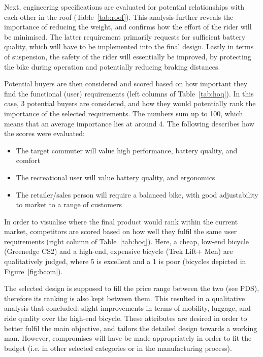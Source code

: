 \documentclass[a4paper,11pt]{article}
\begin{document}
Next, engineering specifications are evaluated for potential relationships with each other in the roof (Table~\ref{tab:roof}). This analysis further reveals the importance of reducing the weight, and confirms how the effort of the rider will be minimised. The latter requirement primarily requests for sufficient battery quality, which will have to be implemented into the final design. Lastly in terms of suspension, the safety of the rider will essentially be improved, by protecting the bike during operation and potentially reducing braking distances.

Potential buyers are then considered and scored based on how important they find the functional (user) requirements (left columns of Table~\ref{tab:hoq}). In this case, 3 potential buyers are considered, and how they would potentially rank the importance of the selected requirements. The numbers sum up to 100, which means that an average importance lies at around 4. The following describes how the scores were evaluated:
\begin{itemize}
	\setlength{\itemsep}{0pt}
	\item The target commuter will value high performance, battery quality, and comfort
	\item The recreational user will value battery quality, and ergonomics
	\item The retailer/sales person will require a balanced bike, with good adjustability to market to a range of customers
\end{itemize}

In order to visualise where the final product would rank within the current market, competitors are scored based on how well they fulfil the same user requirements (right column of Table~\ref{tab:hoq}). Here, a cheap, low-end bicycle (Greenedge CS2) and a high-end, expensive bicycle (Trek Lift+ Men) are qualitatively judged, where 5 is excellent and a 1 is poor (bicycles depicted in Figure~\ref{fig:bcom}). 

The selected design is supposed to fill the price range between the two (see PDS), therefore its ranking is also kept between them. This resulted in a qualitative analysis that concluded: slight improvements in terms of mobility, luggage, and ride quality over the high-end bicycle. These attributes are desired in order to better fulfil the main objective, and tailors the detailed design towards a working man. However, compromises will have be made appropriately in order to fit the budget (i.e. in other selected categories or in the manufacturing process).
\end{document}
